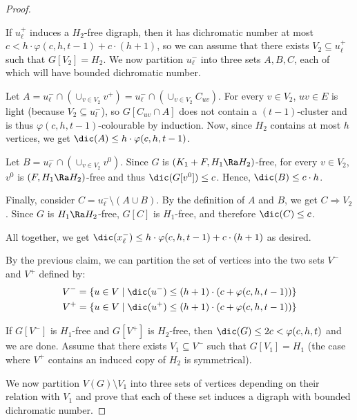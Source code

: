 \begin{proof}
\begin{subproof}
    If $u^+_{\ell}$ induces a $H_2$-free digraph, then it has  dichromatic number at most $c< h\cdot\varphi(c,h,t-1)+c\cdot (h+1)$, so we can assume that there exists $V_2 \subseteq u^{+}_{\ell}$ such that $G[V_2] = H_{2}$. We now partition $u^-_{\ell}$ into three sets $A, B, C$, each of which will have bounded dichromatic number.
    
    Let $A = u^{-}_{\ell} \cap (\cup_{v \in V_2} v^+) =u^{-}_{\ell} \cap (\cup_{v \in V_2} C_{uv})$.
        For every $v \in V_2$, $uv \in E$ is light (because $V_2 \subseteq u_l^-$), so $G[C_{uv} \cap A]$ does not contain a $(t-1)$-cluster and is thus $\varphi(c,h,t-1)$-colourable by induction. Now, since $H_2$ contains at most $h$ vertices, we get $\dic(A) \leq h \cdot  \varphi(c,h,t-1)$.
        
    Let $B=u^{-}_{\ell} \cap (\cup_{v \in V_2} v^0)$. Since $G$ is $(K_1+F, H_1 \Ra H_2)$-free, for every $v \in V_2$, $v^0$ is $(F, H_1 \Ra H_2)$-free and thus $\dic(G[v^0]) \leq c$. Hence, $\dic(B) \leq c\cdot h$. 
    
    Finally, consider $C=u^{-}_{\ell}\setminus (A\cup B)$. By the definition of $A$ and $B$, we get $C \Rightarrow V_2$. Since $G$ is $H_1 \Ra H_2$-free, $G[C]$ is $H_1$-free, and therefore $\dic(C) \leq c$.
    
    All together, we get $\dic(x^{-}_{\ell}) \leq h \cdot \varphi(c,h,t-1)+c \cdot (h + 1)$ as desired.
\end{subproof}

By the previous claim, we can partition the set of vertices into the two sets $V^-$ and $V^+$ defined by: 
\begin{eqnarray*}
V^- = \{ u \in V \mid \dic(u^{-}) \leq (h+1) \cdot (c+\varphi(c,h,t-1))\}\\
V^+ = \{ u \in V \mid \dic(u^{+}) \leq (h+1) \cdot (c+\varphi(c,h,t-1))\}
\end{eqnarray*}


If $G[V^-]$ is $H_1$-free and $G[V^+]$ is $H_2$-free, then $\dic(G) \leq 2c<\varphi(c,h,t) $ and we are done. Assume  that there exists $V_1 \subseteq V^-$ such that $G[V_1] = H_{1}$ (the case where $V^+$ contains an induced copy of $H_2$ is symmetrical). 

We now partition $V(G) \setminus V_1$ into three sets of vertices depending on their relation with $V_1$ and prove that each of these set induces a digraph with bounded dichromatic number.
        

\end{proof}
